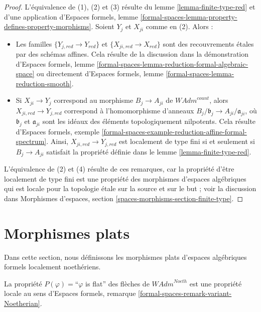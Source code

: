 \begin{proof}
L'équivalence de (1), (2) et (3) résulte du lemme
\ref{lemma-finite-type-red} et d'une application d'Espaces formels, lemme
\ref{formal-spaces-lemma-property-defines-property-morphisms}.
Soient $Y_j$ et $X_{ji}$ comme en (2). Alors :
\begin{itemize}
\item Les familles $\{Y_{j, red} \to Y_{red}\}$ et
$\{X_{ji, red} \to X_{red}\}$ sont des recouvrements étales par des schémas
affines. Cela résulte de la discussion dans la démonstration d'Espaces formels,
lemme
\ref{formal-spaces-lemma-reduction-formal-algebraic-space}
ou directement d'Espaces formels, lemme
\ref{formal-spaces-lemma-reduction-smooth}.
\item Si $X_{ji} \to Y_j$ correspond au morphisme
$B_j \to A_{ji}$ de $\textit{WAdm}^{count}$, alors
$X_{ji, red} \to Y_{j, red}$ correspond à l'homomorphisme d'anneaux
$B_j/\mathfrak b_j \to A_{ji}/\mathfrak a_{ji}$, où
$\mathfrak b_j$ et $\mathfrak a_{ji}$ sont les idéaux des éléments
topologiquement nilpotents. Cela résulte d'Espaces formels, exemple
\ref{formal-spaces-example-reduction-affine-formal-spectrum}.
Ainsi, $X_{ji, red} \to Y_{j, red}$ est localement de type fini si et seulement
si $B_j \to A_{ji}$ satisfait la propriété définie dans le
lemme \ref{lemma-finite-type-red}.
\end{itemize}
L'équivalence de (2) et (4) résulte de ces remarques, car la propriété d'être
localement de type fini est une propriété des morphismes d'espaces algébriques
qui est locale pour la topologie étale sur la source et sur le but ; voir la
discussion dans Morphismes d'espaces, section
\ref{spaces-morphisms-section-finite-type}.
\end{proof}


















\section{Morphismes plats}
\label{section-flat}

\noindent
Dans cette section, nous définissons les morphismes plats d'espaces
algébriques formels localement noethériens.

\begin{lemma}
\label{lemma-flat-axioms}
La propriété $P(\varphi)=$``$\varphi$ is flat'' des flèches de
$\textit{WAdm}^{Noeth}$ est une propriété locale au sens d'Espaces
formels, remarque \ref{formal-spaces-remark-variant-Noetherian}.
\end{lemma}

